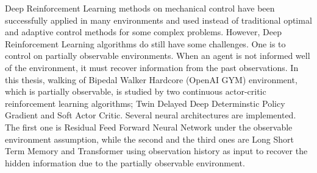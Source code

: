 Deep Reinforcement Learning methods on mechanical control have been successfully applied in many environments and used instead of traditional optimal and adaptive control methods for some complex problems. 
However, Deep Reinforcement Learning algorithms do still have some challenges. 
One is to control on partially observable environments. 
When an agent is not informed well of the environment, it must recover information from the past observations. 
In this thesis, walking of Bipedal Walker Hardcore (OpenAI GYM) environment, 
which is partially observable, 
is studied by two continuous actor-critic reinforcement learning algorithms; Twin Delayed Deep Determinstic Policy Gradient and Soft Actor Critic.
Several neural architectures are implemented. 
The first one is Residual Feed Forward Neural Network under the observable environment assumption, 
while the second and the third ones are Long Short Term Memory and Transformer using observation history as input to recover the hidden information due to the partially observable environment. 
